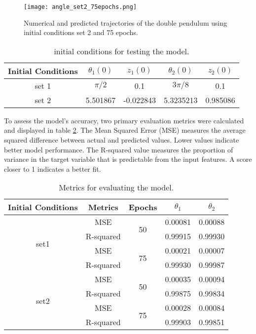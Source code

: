 \documentclass[12pt]{article}
\begin{document}
\begin{figure}[H]
    \centering
    \texttt{[image: angle\_set2\_75epochs.png]}
    \caption{Numerical and predicted trajectories of the double pendulum using initial conditions set 2 and 75 epochs.}
    \label{fig:angle_set2_75epochs_trajectory}
\end{figure}

\begin{table}[ht]
    \centering
    \caption{initial conditions for testing the model.}
    \label{tab: initial conditions}
    \vspace{0.25cm}
    \begin{tabular}{ |c|c|c|c|c| } 
        \hline
        Initial Conditions & $\theta_1(0)$ & $z_1(0)$ & $\theta_2(0)$ & $z_2(0)$ \\
        \hline
        set 1 & $\pi/2$ & 0.1 & $3\pi/8$ & 0.1\\
        set 2 & 5.501867 & -0.022843 & 5.3235213 & 0.985086\\ 
        \hline
        \end{tabular}
\end{table}

\noindent To assess the model's accuracy, two primary evaluation metrics were calculated and displayed in table \ref{tab:model_metrics}. 
The Mean Squared Error (MSE) measures the average squared difference between actual and predicted values. Lower values indicate better model performance. 
The R-squared value measures the proportion of variance in the target variable that is predictable from the input features. A score closer to 1 indicates a better fit.

\break

\begin{table}[ht]
    \centering
    \caption{Metrics for evaluating the model.} 
    \label{tab:model_metrics}
    \begin{tabular}{|c|c|c|c|c|}
        \hline
        Initial Conditions &  Metrics     & Epochs   & $\theta_1$  & $\theta_2$  \\
        \hline
         \multirow{4}{*}{set1} &   MSE   & \multirow{2}{*}{50} & 0.00081 & 0.00088 \\
                                    &  R-squared   &      & 0.99915 & 0.99930 \\
        \cline{2-5}
                        &      MSE         & \multirow{2}{*}{75} & 0.00021 & 0.00007 \\
                        &  R-squared       &              & 0.99930 & 0.99987 \\
        \hline
         \multirow{4}{*}{set2} &   MSE   & \multirow{2}{*}{50} & 0.00035 & 0.00094 \\
                                    &  R-squared   &      & 0.99875 & 0.99834 \\
        \cline{2-5}
                        &      MSE         & \multirow{2}{*}{75} & 0.00028 & 0.00084 \\
                        &  R-squared       &              & 0.99903 & 0.99851 \\
        \hline
    \end{tabular}
\end{table}
\end{document}
